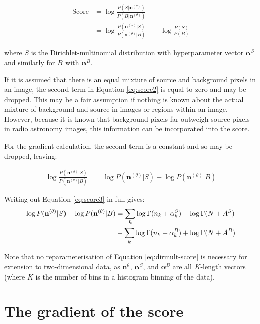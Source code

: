 \begin{align}
\text{Score} &= \log \frac{P(S | \textbf{n}^{(\theta)})}{P(B | \textbf{n}^{(\theta)})} \label{eq:score} \\
&= \log \frac{P(\textbf{n}^{(\theta)} | S)}{P(\textbf{n}^{(\theta)} | B)} \;\; + \; \log \frac{P(S)}{P(B)}\label{eq:score2}
\end{align}

where $S$ is the Dirichlet-multinomial distribution with hyperparameter vector $\boldsymbol{\alpha}^S$ and similarly for $B$ with $\boldsymbol{\alpha}^B$.

If it is assumed that there is an equal mixture of source and background pixels in an image, the second term in Equation \ref{eq:score2} is equal to zero and may be dropped. This may be a fair assumption if nothing is known about the actual mixture of background and source in images or regions within an image. However, because it is known that background pixels far outweigh source pixels in radio astronomy images, this information can be incorporated into the score.

For the gradient calculation, the second term is a constant and so may be dropped, leaving:

\begin{align}
\log \frac{P(\textbf{n}^{(\theta)} | S)}{P(\textbf{n}^{(\theta)} | B)}
&= \log {P(\textbf{n}^{(\theta)} | S)} - \log {P(\textbf{n}^{(\theta)} | B)} \label{eq:score3}
\end{align}

Writing out Equation \ref{eq:score3} in full gives:
\begin{align}
\log {P(\textbf{n}^{(\theta)} | S)} - \log {P(\textbf{n}^{(\theta)} | B)} &= \sum_k \log \Gamma (n_k + \alpha^S_k) - \log \Gamma (N + A^S) \notag\\
&- \sum_k \log \Gamma (n_k + \alpha^B_k) + \log \Gamma (N + A^B) \label{eq:dirmult-score}
\end{align}

Note that no reparameterisation of Equation \ref{eq:dirmult-score} is necessary for extension to two-dimensional data, as $\textbf{n}^{\theta}$, $\boldsymbol{\alpha}^S$, and $\boldsymbol{\alpha}^B$ are all $K$-length vectors (where $K$ is the number of bins in a histogram binning of the data).


\section{The gradient of the score}

